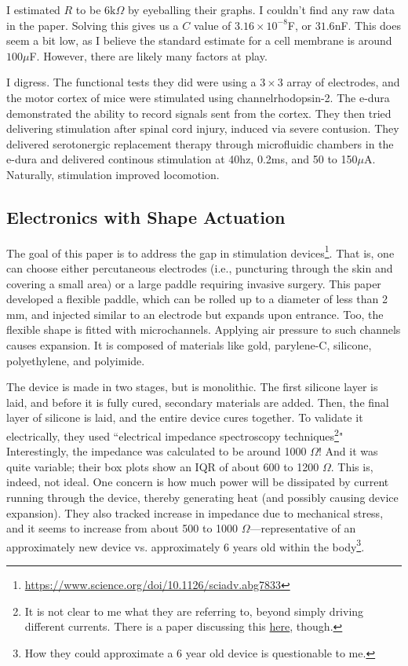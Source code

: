 \documentclass[12pt]{report}
\begin{document}
I estimated $R$ to be $6\mathrm{k}\Omega$ by eyeballing their graphs. I couldn't find any raw data in the paper. Solving this gives us a $C$ value of $3.16\times10^{-8}$F, or $31.6$nF. This does seem a bit low, as I believe the standard estimate for a cell membrane is around $100\mu$F. However, there are likely many factors at play.\newline

I digress. The functional tests they did were using a $3\times3$ array of electrodes, and the motor cortex of mice were stimulated using channelrhodopsin-2. The e-dura demonstrated the ability to record signals sent from the cortex. They then tried delivering stimulation after spinal cord injury, induced via severe contusion. They delivered serotonergic replacement therapy through microfluidic chambers in the e-dura and delivered continous stimulation at 40hz, 0.2ms, and 50 to 150$\mu$A. Naturally, stimulation improved locomotion. 

\subsection{Electronics with Shape Actuation}

The goal of this paper is to address the gap in stimulation devices\footnote{\url{https://www.science.org/doi/10.1126/sciadv.abg7833}}. That is, one can choose either percutaneous electrodes (i.e., puncturing through the skin and covering a small area) or a large paddle requiring invasive surgery. This paper developed a flexible paddle, which can be rolled up to a diameter of less than 2 mm, and injected similar to an electrode but expands upon entrance. Too, the flexible shape is fitted with microchannels. Applying air pressure to such channels causes expansion. It is composed of materials like gold, parylene-C, silicone, polyethylene, and polyimide.\newline 

The device is made in two stages, but is monolithic. The first silicone layer is laid, and before it is fully cured, secondary materials are added. Then, the final layer of silicone is laid, and the entire device cures together. To validate it electrically, they used ``electrical impedance spectroscopy techniques\footnote{It is not clear to me what they are referring to, beyond simply driving different currents. There is a paper discussing this \href{https://www.ncbi.nlm.nih.gov/pmc/articles/PMC8512860/}{here}, though.}" Interestingly, the impedance was calculated to be around 1000 $\Omega$! And it was quite variable; their box plots show an IQR of about 600 to 1200 $\Omega$. This is, indeed, not ideal. One concern is how much power will be dissipated by current running through the device, thereby generating heat (and possibly causing device expansion). They also tracked increase in impedance due to mechanical stress, and it seems to increase from about 500 to 1000 $\Omega$---representative of an approximately new device vs. approximately 6 years old within the body\footnote{How they could approximate a 6 year old device is questionable to me.}.\newline
\end{document}
